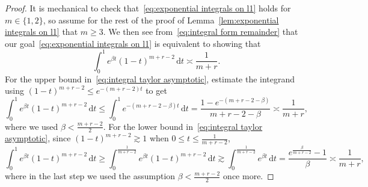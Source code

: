 \documentclass[11pt,reqno]{amsart}
\renewcommand{\le}{\leqslant}
\renewcommand{\ge}{\geqslant}
\newcommand{\ud}[0]{\,\mathrm{d}}
\theoremstyle{remark}
\renewcommand{\1}{\mathbf 1}
\begin{document}
\begin{proof}
It is mechanical to check that~\eqref{eq:exponential integrals on l1} holds for $m\in \{1,2\}$, so assume for the rest of the proof of Lemma~\ref{lem:exponential integrals on l1} that $m\ge 3$.  We then see from~\eqref{eq:integral form remainder} that our goal~\eqref{eq:exponential integrals on l1} is equivalent to showing that
\begin{equation}\label{eq:integral taylor asymptotic}
\int_0^1 e^{\beta t}(1-t)^{m+r-2}\ud t\asymp \frac{1}{m+r}.
\end{equation}
For the upper bound in~\eqref{eq:integral taylor asymptotic}, estimate the integrand using $(1-t)^{m+r-2}\le e^{-(m+r-2)t}$ to get
$$
\int_0^1 e^{\beta t}(1-t)^{m+r-2}\ud t\le \int^1_0 e^{-(m+r-2-\beta)t}\ud t= \frac{1-e^{-(m+r-2-\beta)}}{m+r-2-\beta}\asymp \frac{1}{m+r},
$$
where we used $\beta<\frac{m+r-2}{2}$. For the lower bound in~\eqref{eq:integral taylor asymptotic}, since $(1-t)^{m+r-2}\gtrsim 1$ when $0\le t\le \frac{1}{m+r-2}$,
$$
\int_0^1 e^{\beta t}(1-t)^{m+r-2}\ud t\ge \int_0^{\frac{1}{m+r-2}} e^{\beta t}(1-t)^{m+r-2}\ud t\gtrsim  \int_0^{\frac{1}{m+r-2}} e^{\beta t}\ud t= \frac{e^{\frac{\beta}{m+r-2}}-1}{\beta}\asymp \frac{1}{m+r},
$$
where in the last step we used the assumption $\beta<\frac{m+r-2}{2}$ once more.
\end{proof}
\end{document}

